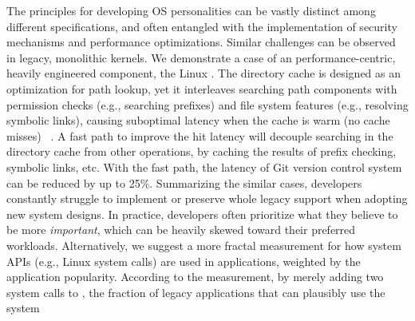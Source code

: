 The principles for developing OS personalities can be vastly distinct
among different specifications,
and often entangled with
the implementation of
security mechanisms and performance optimizations.
Similar challenges can be observed in legacy, monolithic kernels.
We demonstrate a case of an performance-centric, heavily engineered component,
the Linux .
The directory cache is designed as an optimization for path lookup,
yet it interleaves searching path components
with permission checks (e.g., searching prefixes)
and file system features (e.g., resolving symbolic links),
causing suboptimal latency when the cache is warm (no cache misses)
~\citep{tsai15dcache}.
A fast path to improve the hit latency
will decouple searching in the directory cache
from other operations,
by %
caching the results of prefix checking, symbolic links, etc.
With the fast path,
the latency of Git version control system
can be reduced by up to 25\%.
Summarizing the similar cases,
developers constantly struggle to
implement or preserve whole legacy support
when adopting new system designs. 
In practice,
developers often prioritize
what they believe to be more \emph{important},
which can be heavily skewed toward their preferred workloads.
Alternatively,
we suggest a more fractal measurement
for how system APIs
(e.g., Linux system calls)
are used in applications,
weighted by the application popularity.
According to the measurement,
by merely adding two system calls to \graphene{},
the fraction of legacy applications that can plausibly use the system
